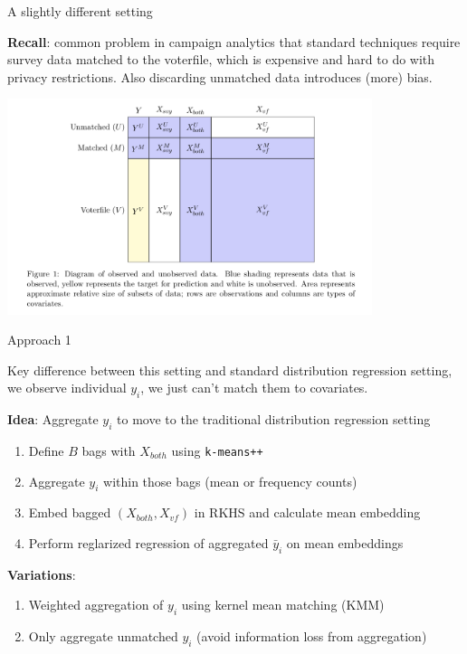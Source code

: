 \documentclass[ignorenonframetext,]{beamer}
\begin{document}
\begin{frame}{A slightly different setting}

\textbf{Recall}: common problem in campaign analytics that standard techniques require survey data matched to the voterfile, which is expensive and hard to do with privacy restrictions.  Also discarding unmatched data introduces (more) bias.

\begin{center}
	\includegraphics[width=0.8\textwidth]{photos/oursetting.png}
\end{center}

\end{frame}

\begin{frame}{Approach 1}

Key difference between this setting and standard distribution regression setting, we observe individual $y_i$, we just can't match them to covariates. 

\textbf{Idea}: Aggregate $y_i$ to move to the traditional distribution regression setting\pause
\begin{enumerate}
	\item Define $B$ bags with $X_{both}$ using \texttt{k-means++}
	\item Aggregate $y_i$ within those bags (mean or frequency counts)
	\item Embed bagged $\left(X_{both}, X_{vf}\right)$ in RKHS and calculate mean embedding
	\item Perform reglarized regression of aggregated $\bar{y}_i$ on mean embeddings
\end{enumerate}

\pause
\textbf{Variations}:
\begin{enumerate}
	\item Weighted aggregation of $y_i$ using kernel mean matching (KMM)
	\item Only aggregate unmatched $y_i$ (avoid information loss from aggregation)
\end{enumerate}


\end{frame}
\end{document}
